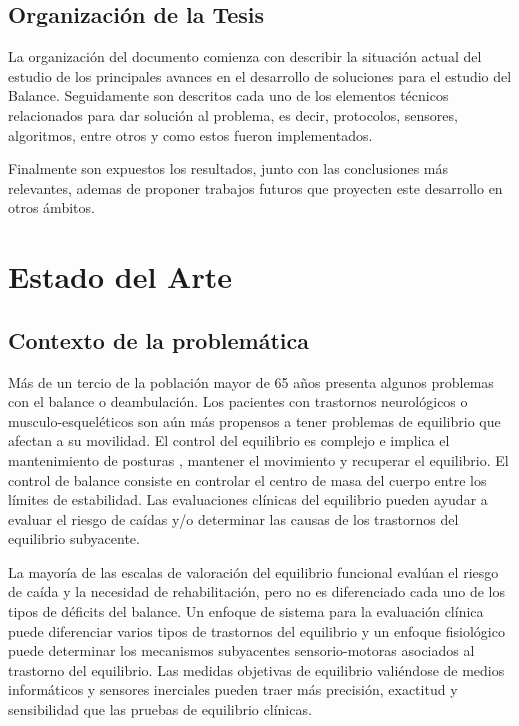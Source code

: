 \documentclass[12pt,a4paper]{article}
\begin{document}
\subsection{Organizaci\'on de la Tesis}
La organización del documento comienza con describir la situación actual del estudio de los principales avances en el desarrollo de soluciones para el estudio del Balance. Seguidamente son descritos cada uno de los elementos técnicos relacionados para dar solución al problema, es decir,  protocolos, sensores, algoritmos, entre otros y como estos fueron implementados.

Finalmente son expuestos los resultados, junto con las conclusiones más relevantes, ademas de proponer trabajos futuros que proyecten este desarrollo en otros ámbitos.


\section{Estado del Arte}

\subsection{Contexto de la problemática}
Más de un tercio de la población mayor de 65 años presenta algunos problemas con el balance o deambulación. Los pacientes con trastornos neurológicos o musculo-esqueléticos son aún más propensos a tener problemas de equilibrio que afectan a su movilidad.
El control del equilibrio es complejo e implica el mantenimiento de posturas \cite{mancini_relevance_2010}, mantener el movimiento y recuperar el equilibrio. El control de balance consiste en controlar el centro de masa del cuerpo entre los límites de estabilidad. Las evaluaciones clínicas del equilibrio pueden ayudar a evaluar el riesgo de caídas y/o determinar las causas de los trastornos del equilibrio subyacente.

La mayoría de las escalas de valoración del equilibrio funcional evalúan el riesgo de caída y la necesidad de rehabilitación, pero no es diferenciado cada uno de los tipos de déficits del balance. Un enfoque de sistema para la evaluación clínica puede diferenciar varios tipos de trastornos del equilibrio y un enfoque fisiológico puede determinar los mecanismos subyacentes sensorio-motoras asociados al trastorno del equilibrio. Las medidas objetivas de equilibrio valiéndose de medios informáticos y sensores inerciales pueden traer más precisión, exactitud y sensibilidad que las pruebas de equilibrio clínicas\cite{chaudhry_measurement_2011}.
\end{document}
